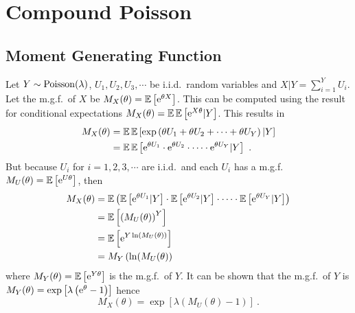 \chapter{Compound Poisson}

\section{Moment Generating Function}
\label{chapter:appendix_compoundPoissonMgf}

Let $Y\sim\operatorname{Poisson}(\lambda)$, $U_1,U_2,U_3,\cdots$ be i.i.d.~random variables and $X|Y=\sum_{i=1}^YU_i$. Let the m.g.f.~of $X$ be $M_X(\theta)=\operatorname{\mathbb{E}}\left[\mathrm{e}^{\theta X}\right]$. This can be computed using the result for conditional expectations $M_X(\theta)=\operatorname{\mathbb{E}}\operatorname{\mathbb{E}}\left[\mathrm{e}^{X\theta}|Y\right]$. This results in 
\begin{align}
  M_X(\theta)&=\operatorname{\mathbb{E}}\operatorname{\mathbb{E}}\left[\exp\left(\theta U_1 + \theta U_2 + \cdots + \theta U_Y\right)|Y\right]
  \nonumber \\
  &=\operatorname{\mathbb{E}}\operatorname{\mathbb{E}}\left[\mathrm{e}^{\theta U_1}\cdot\mathrm{e}^{\theta U_2}\cdot\cdots\cdot\mathrm{e}^{\theta U_Y}|Y\right]
  \ .
\end{align}
But because $U_i$ for $i=1,2,3,\cdots$ are i.i.d.~and each $U_i$ has a m.g.f.~$M_U(\theta)=\operatorname{\mathbb{E}}\left[\mathrm{e}^{U\theta}\right]$, then
\begin{align}
  M_X(\theta)&=\operatorname{\mathbb{E}}\left(
    \operatorname{\mathbb{E}}\left[\mathrm{e}^{\theta U_1}|Y\right]\cdot
    \operatorname{\mathbb{E}}\left[\mathrm{e}^{\theta U_2}|Y\right]\cdot
    \cdots \cdot
    \operatorname{\mathbb{E}}\left[\mathrm{e}^{\theta U_Y}|Y\right]
  \right)
  \nonumber\\
  &=\operatorname{\mathbb{E}}\left[\left(M_U(\theta)\right)^Y\right]
  \nonumber\\
  &=\operatorname{\mathbb{E}}\left[\mathrm{e}^{Y\ln(M_U(\theta))}\right]
  \nonumber\\
  & = M_Y\left(\ln(M_U(\theta)\right)
\end{align}
where $M_Y(\theta)=\operatorname{\mathbb{E}}\left[\mathrm{e}^{Y\theta}\right]$ is the m.g.f.~of $Y$. It can be shown that the m.g.f.~of $Y$ is
$
  M_Y(\theta)=
  \exp
  \left[
    \lambda
    \left(
      \mathrm{e}^\theta-1
    \right)
  \right]
$
hence
\begin{equation}
  M_X(\theta)=
  \exp\left[
    \lambda
    \left(
      M_U(\theta)-1
    \right)
  \right]
  \ .
\end{equation}

